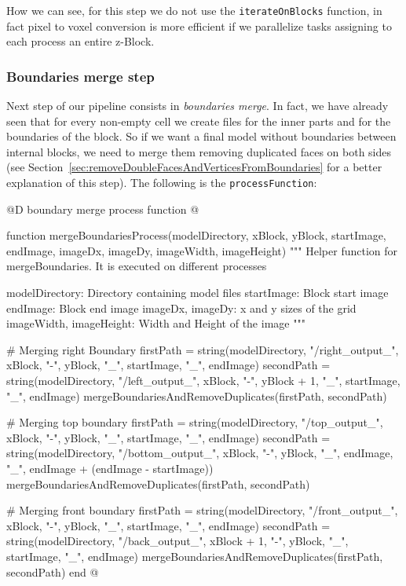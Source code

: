 \documentclass[11pt,oneside]{article}	%
\begin{document}
How we can see, for this step we do not use the \texttt{iterateOnBlocks} function, in fact pixel to voxel conversion is more efficient if we parallelize tasks assigning to each process an entire z-Block.

\subsubsection{Boundaries merge step}\label{sec:boundariesStep}
Next step of our pipeline consists in \textit{boundaries merge}. In fact, we have already seen that for every non-empty cell we create files for the inner parts and for the boundaries of the block. So if we want a final model without boundaries between internal blocks, we need to merge them removing duplicated faces on both sides (see Section~\ref{sec:removeDoubleFacesAndVerticesFromBoundaries} for a better explanation of this step). The following is the \texttt{processFunction}:

@D boundary merge process function
@{function mergeBoundariesProcess(modelDirectory,
				  xBlock, yBlock,
				  startImage, endImage,
				  imageDx, imageDy,
				  imageWidth, imageHeight)
  """
  Helper function for mergeBoundaries.
  It is executed on different processes

  modelDirectory: Directory containing model files
  startImage: Block start image
  endImage: Block end image
  imageDx, imageDy: x and y sizes of the grid
  imageWidth, imageHeight: Width and Height of the image
  """

  # Merging right Boundary
  firstPath = string(modelDirectory, "/right_output_", xBlock, "-", yBlock,
		    "_", startImage, "_", endImage)
  secondPath = string(modelDirectory, "/left_output_", xBlock, "-", yBlock + 1,
		    "_", startImage, "_", endImage)
  mergeBoundariesAndRemoveDuplicates(firstPath, secondPath)

  # Merging top boundary
  firstPath = string(modelDirectory, "/top_output_", xBlock, "-", yBlock,
		      "_", startImage, "_", endImage)
  secondPath = string(modelDirectory, "/bottom_output_", xBlock, "-", yBlock,
		      "_", endImage, "_", endImage + (endImage - startImage))
  mergeBoundariesAndRemoveDuplicates(firstPath, secondPath)

  # Merging front boundary
  firstPath = string(modelDirectory, "/front_output_", xBlock, "-", yBlock,
		    "_", startImage, "_", endImage)
  secondPath = string(modelDirectory, "/back_output_", xBlock + 1, "-", yBlock,
		    "_", startImage, "_", endImage)
  mergeBoundariesAndRemoveDuplicates(firstPath, secondPath)
end @}
\end{document}
